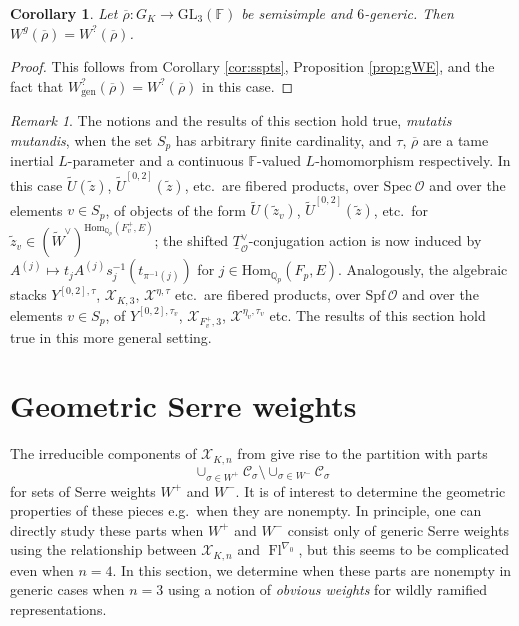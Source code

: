 \documentclass[oneside,a4paper,english, 11pt]{amsart}
\theoremstyle{plain}
\theoremstyle{plain}
\theoremstyle{plain}
\theoremstyle{plain}
\theoremstyle{plain}
\theoremstyle{plain}
\newtheorem{cor}[thm]{Corollary}
\theoremstyle{definition}
\theoremstyle{definition}
\theoremstyle{definition}
\theoremstyle{remark}
\newtheorem{rmk}[thm]{Remark}
\numberwithin{equation}{section}
\newcommand{\Qp}{\mathbb{Q}_p}
\newcommand{\F}{\mathbb{F}}
\newcommand{\cC}{\mathcal{C}}
\newcommand{\cO}{\mathcal{O}}
\newcommand{\cX}{\mathcal{X}}
\newcommand{\Hom}{\mathrm{Hom}}
\newcommand{\GL}{\mathrm{GL}}
\newcommand{\Spec}{\mathrm{Spec}\ }
\newcommand{\un}[1]{\underline{#1}}
\newcommand{\tld}[1]{\widetilde{#1}}
\newcommand{\rhobar}{\overline{\rho}}
\newcommand{\Spf}{\mathrm{Spf}}
\DeclareMathOperator{\Fl}{Fl}
\newcommand{\ra}{\rightarrow}
\begin{document}
\begin{cor}\label{cor:g=?}
Let $\rhobar: G_K \ra \GL_3(\F)$ be semisimple and $6$-generic.
Then $W^g(\rhobar) = W^?(\rhobar)$.
\end{cor}
\begin{proof}
This follows from Corollary \ref{cor:sspts}, Proposition \ref{prop:gWE}, and the fact that $W^?_{\mathrm{gen}}(\rhobar)= W^?(\rhobar)$ in this case. 
\end{proof}



%
%
\begin{rmk}
\label{rmk:products:1}
The notions and the results of this section hold true, \emph{mutatis mutandis}, when the set $S_p$ has arbitrary finite cardinality, and $\tau$, $\rhobar$ are a tame inertial $L$-parameter and a continuous $\F$-valued $L$-homomorphism respectively.
In this case $\tld{U}(\tld{z})$, $\tld{U}^{[0,2]}(\tld{z})$, etc.~are fibered products, over $\Spec\cO$ and over the elements $v\in S_p$, of objects of the form $\tld{U}(\tld{z}_v)$, $\tld{U}^{[0,2]}(\tld{z})$, etc.~for $\tld{z}_v\in (\tld{W}^{\vee})^{\Hom_{\Qp}(F^+_v,E)}$; the shifted $\un{T}_{\cO}^\vee$-conjugation action is now induced by $A^{(j)}\mapsto t_j A^{(j)} s^{-1}_j(t_{\pi^{-1}(j)})$ for $j\in \Hom_{\Qp}(F_p,E)$.
Analogously, the algebraic stacks $Y^{[0,2],\tau}$, $\cX_{K,3}$, $\cX^{\eta,\tau}$ etc.~are fibered products, over $\Spf \, \cO$ and over the elements $v\in S_p$, of $Y^{[0,2],\tau_v}$, $\cX_{F_v^+,3}$, $\cX^{\eta_v,\tau_v}$ etc.
The results of this section hold true in this more general setting.
\end{rmk}




\section{Geometric Serre weights}
\label{sec:GSW}
The irreducible components of $\cX_{K,n}$ from \cite[Definition 3.2.1]{EGstack} give rise to the partition with parts \[\cup_{\sigma \in W^+} \cC_\sigma \setminus \cup_{\sigma \in W^-} \cC_\sigma\] for sets of Serre weights $W^+$ and $W^-$. 
It is of interest to determine the geometric properties of these pieces e.g.~when they are nonempty. 
In principle, one can directly study these parts when $W^+$ and $W^-$ consist only of generic Serre weights using the relationship between $\cX_{K,n}$ and $\Fl^{\nabla_0}$, but this seems to be complicated even when $n=4$. 
In this section, we determine when these parts are nonempty in generic cases when $n=3$ using a notion of \emph{obvious weights} for wildly ramified representations. 
%
\end{document}

